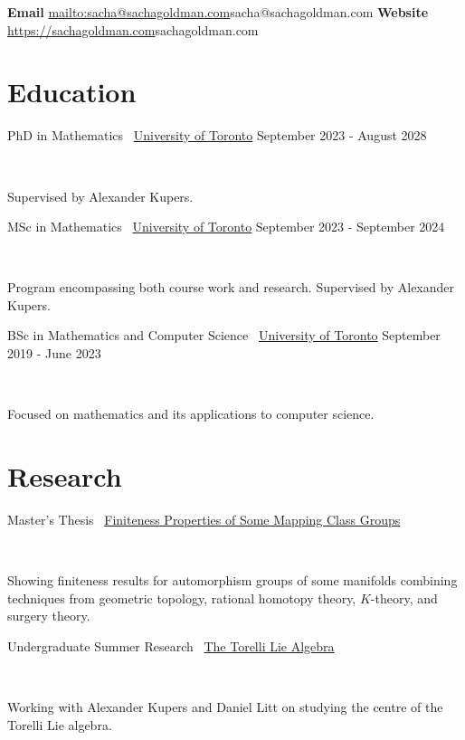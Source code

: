 \documentclass[]{style}
\begin{document}

\vspace{-5mm}
\begin{center}
	\textbf{Email}
	\url{mailto:sacha@sachagoldman.com}{sacha@sachagoldman.com} \hspace{1cm}
	\textbf{Website} 
	\url{https://sachagoldman.com}{sachagoldman.com}
\end{center}
\vspace{5mm}
 
\section{Education}

\begin{entrylist}

\vspace{1mm}

\entry
{PhD in Mathematics \ {\normalfont \underline{University of Toronto}}}
{September 2023 - August 2028}
{  ~ \vspace{-2.5mm}

Supervised by Alexander Kupers.
}

\entry
{MSc in Mathematics \ {\normalfont \underline{University of Toronto}}}
{September 2023 - September 2024}
{  ~ \vspace{-2.5mm}

Program encompassing both course work and research. Supervised by Alexander Kupers.
}

\entry
{BSc in Mathematics and Computer Science \ {\normalfont \underline{University of Toronto}}}
{September 2019 - June 2023}
{ ~ \vspace{-2.5mm}

Focused on mathematics and its applications to computer science.
}

\end{entrylist}

\section{Research}

\begin{entrylist}

\vspace{1mm}

\entry
{Master's Thesis \ {\normalfont \underline{Finiteness Properties of Some Mapping Class Groups}}}
{}
{ ~ \vspace{-2.5mm}

Showing finiteness results for automorphism groups of some manifolds combining techniques from geometric topology, rational homotopy theory, $K$-theory, and surgery theory.}

\entry
{Undergraduate Summer Research \ {\normalfont \underline{The Torelli Lie Algebra}}}
{}
{ ~ \vspace{-2.5mm}

Working with Alexander Kupers and Daniel Litt on studying the centre of the Torelli Lie algebra.}

\end{entrylist}
\end{document}
